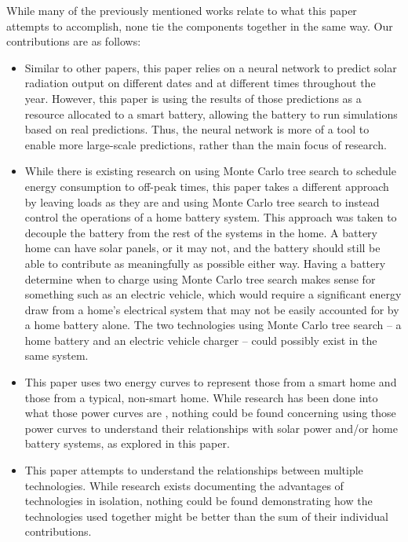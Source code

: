 While many of the previously mentioned works relate to what this paper attempts to accomplish, none tie the components together in the same way. Our contributions are as follows:

\begin{itemize}
  \item Similar to other papers, this paper relies on a neural network to predict solar radiation output on different dates and at different times throughout the year. However, this paper is using the results of those predictions as a resource allocated to a smart battery, allowing the battery to run simulations based on real predictions. Thus, the neural network is more of a tool to enable more large-scale predictions, rather than the main focus of research.
  \item While there is existing research on using Monte Carlo tree search to schedule energy consumption to off-peak times, this paper takes a different approach by leaving loads as they are and using Monte Carlo tree search to instead control the operations of a home battery system. This approach was taken to decouple the battery from the rest of the systems in the home. A battery home can have solar panels, or it may not, and the battery should still be able to contribute as meaningfully as possible either way. Having a battery determine when to charge using Monte Carlo tree search makes sense for something such as an electric vehicle, which would require a significant energy draw from a home's electrical system that may not be easily accounted for by a home battery alone. The two technologies using Monte Carlo tree search -- a home battery and an electric vehicle charger -- could possibly exist in the same system.
  \item This paper uses two energy curves to represent those from a smart home and those from a typical, non-smart home. While research has been done into what those power curves are \cite{fischer_we_2014}, nothing could be found concerning using those power curves to understand their relationships with solar power and/or home battery systems, as explored in this paper.
  \item This paper attempts to understand the relationships between multiple technologies. While research exists documenting the advantages of technologies in isolation, nothing could be found demonstrating how the technologies used together might be better than the sum of their individual contributions.
\end{itemize}
